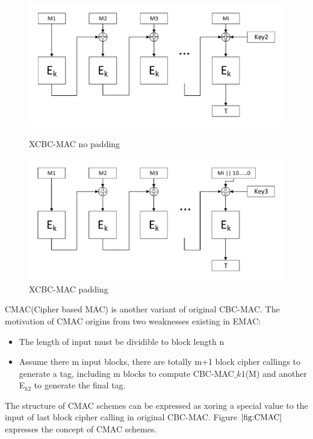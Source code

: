 \documentclass{article}
\begin{document}
\begin{figure}[htbp]
\centering
\includegraphics[scale=0.5]{./diagrams/xcbc-nopadding.pdf}
\caption{XCBC-MAC no padding}
\centering
\includegraphics[scale=0.5]{./diagrams/xcbc-padding.pdf}
\caption{XCBC-MAC padding}
\label{fig:XCBC}
\end{figure}
CMAC(Cipher based MAC) is another variant of original CBC-MAC. The motivation of CMAC origins from two weaknesses existing in EMAC:
\begin{itemize}
	\item The length of input must be dividible to block length n
	\item Assume there m input blocks, there are totally m+1 block cipher callings to generate a tag, including m blocks to compute CBC-MAC$\_{k1}$(M) and another E$_{k2}$ to generate the final tag. 
\end{itemize}
The structure of CMAC schemes can be expressed as xoring a special value to the input of last block cipher calling in original CBC-MAC. Figure $\ref{fig:CMAC}$ expresses the concept of CMAC schemes.
	
\end{document}
